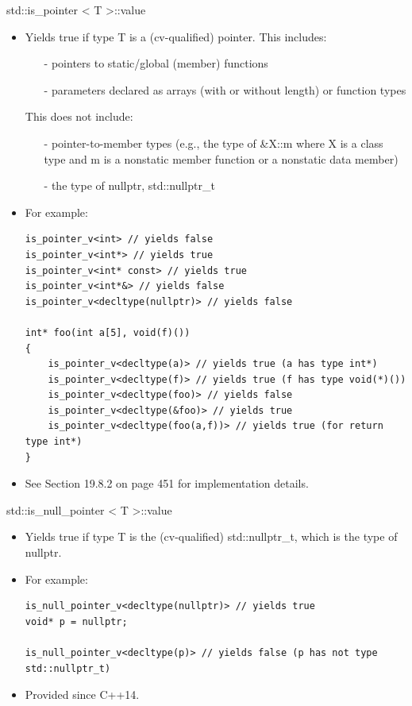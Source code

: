 std::is\_pointer < T >::value
\begin{itemize}
\item 
Yields true if type T is a (cv-qualified) pointer. This includes:
\begin{itemize}
\item[-] 
pointers to static/global (member) functions

\item[-] 
parameters declared as arrays (with or without length) or function types
\end{itemize}

This does not include:

\begin{itemize}
\item[-] 
pointer-to-member types (e.g., the type of \&X::m where X is a class type and m is a nonstatic member function or a nonstatic data member)

\item[-] 
the type of nullptr, std::nullptr\_t
\end{itemize}

\item 
For example:

\begin{lstlisting}[style=styleCXX]
is_pointer_v<int> // yields false
is_pointer_v<int*> // yields true
is_pointer_v<int* const> // yields true
is_pointer_v<int*&> // yields false
is_pointer_v<decltype(nullptr)> // yields false

int* foo(int a[5], void(f)())
{
	is_pointer_v<decltype(a)> // yields true (a has type int*)
	is_pointer_v<decltype(f)> // yields true (f has type void(*)())
	is_pointer_v<decltype(foo)> // yields false
	is_pointer_v<decltype(&foo)> // yields true
	is_pointer_v<decltype(foo(a,f))> // yields true (for return type int*)
}
\end{lstlisting}

\item 
See Section 19.8.2 on page 451 for implementation details.
\end{itemize}

std::is\_null\_pointer < T >::value

\begin{itemize}
\item 
Yields true if type T is the (cv-qualified) std::nullptr\_t, which is the type of nullptr.

\item 
For example:
\begin{lstlisting}[style=styleCXX]
is_null_pointer_v<decltype(nullptr)> // yields true
void* p = nullptr;

is_null_pointer_v<decltype(p)> // yields false (p has not type std::nullptr_t)
\end{lstlisting}

\item 
Provided since C++14.
\end{itemize}

